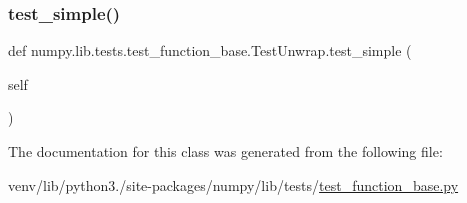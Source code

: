 \mbox{\label{classnumpy_1_1lib_1_1tests_1_1test__function__base_1_1TestUnwrap_a78460ea57ea87d239f1385d40e72c18f}} 
\subsubsection{\texorpdfstring{test\+\_\+simple()}{test\_simple()}}
{\footnotesize\ttfamily def numpy.\+lib.\+tests.\+test\+\_\+function\+\_\+base.\+Test\+Unwrap.\+test\+\_\+simple (\begin{DoxyParamCaption}\item[{}]{self }\end{DoxyParamCaption})}



The documentation for this class was generated from the following file\+:\begin{DoxyCompactItemize}
\item 
venv/lib/python3./site-\/packages/numpy/lib/tests/\hyperlink{lib_2tests_2test__function__base_8py}{test\+\_\+function\+\_\+base.\+py}\end{DoxyCompactItemize}

